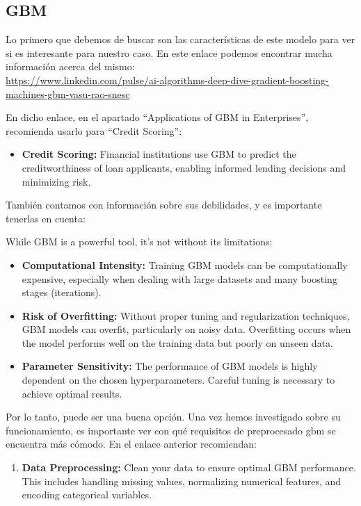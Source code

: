 \documentclass[
]{article}
\providecommand{\tightlist}{%
  \setlength{\itemsep}{0pt}\setlength{\parskip}{0pt}}
\begin{document}
\hypertarget{gbm}{%
\subsection{\texorpdfstring{\textbf{GBM}}{GBM}}\label{gbm}}

Lo primero que debemos de buscar son las características de este modelo
para ver si es interesante para nuestro caso. En este enlace podemos
encontrar mucha información acerca del mismo:\\
\url{https://www.linkedin.com/pulse/ai-algorithms-deep-dive-gradient-boosting-machines-gbm-vasu-rao-snesc}

En dicho enlace, en el apartado ``Applications of GBM in Enterprises'',
recomienda usarlo para ``Credit Scoring'':

\begin{itemize}
\tightlist
\item
  \textbf{Credit Scoring:} Financial institutions use GBM to predict the
  creditworthiness of loan applicants, enabling informed lending
  decisions and minimizing risk.
\end{itemize}

También contamos con información sobre sus debilidades, y es importante
tenerlas en cuenta:

While GBM is a powerful tool, it's not without its limitations:

\begin{itemize}
\item
  \textbf{Computational Intensity:} Training GBM models can be
  computationally expensive, especially when dealing with large datasets
  and many boosting stages (iterations).
\item
  \textbf{Risk of Overfitting:} Without proper tuning and regularization
  techniques, GBM models can overfit, particularly on noisy data.
  Overfitting occurs when the model performs well on the training data
  but poorly on unseen data.
\item
  \textbf{Parameter Sensitivity:} The performance of GBM models is
  highly dependent on the chosen hyperparameters. Careful tuning is
  necessary to achieve optimal results.
\end{itemize}

Por lo tanto, puede ser una buena opción. Una vez hemos investigado
sobre su funcionamiento, es importante ver con qué requisitos de
preprocesado gbm se encuentra más cómodo. En el enlace anterior
recomiendan:

\begin{enumerate}
\def\labelenumi{\arabic{enumi}.}
\tightlist
\item
  \textbf{Data Preprocessing:} Clean your data to ensure optimal GBM
  performance. This includes handling missing values, normalizing
  numerical features, and encoding categorical variables.
\end{enumerate}
\end{document}
